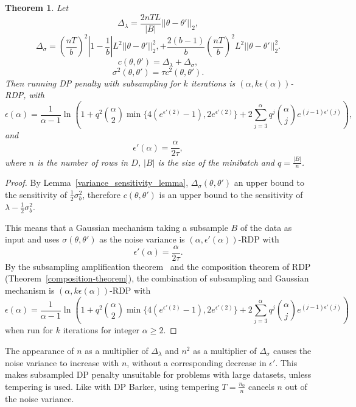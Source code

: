 \documentclass[english,twoside,openright]{HYgraduMLDS}
\newtheorem{theorem}{Theorem}
\begin{document}
\begin{theorem}
    Let
    \[
        \Delta_\lambda = \frac{2nTL}{|B|}||\theta - \theta'||_2,
    \]
    \[
        \Delta_\sigma = \left(\frac{nT}{b}\right)^2 \left|1 - \frac{1}{b}\right|
        L^2||\theta - \theta'||_2^2,
        + \frac{2(b - 1)}{b}\left(\frac{nT}{b}\right)^2 L^2||\theta - \theta'||^2_2.
    \]
    \[
        c(\theta, \theta') = \Delta_\lambda + \Delta_\sigma,
    \]
    \[
        \sigma^2(\theta, \theta') = \tau c^2(\theta, \theta').
    \]
    Then running DP penalty with subsampling for \(k\) iterations 
    is \((\alpha, k\epsilon(\alpha))\)-RDP, with
    \[
        \epsilon(\alpha) = \frac{1}{\alpha - 1}\ln \left(
        1 + q^2\binom{\alpha}{2}\min\{4(e^{\epsilon'(2)} - 1), 2e^{\epsilon'(2)}\}
        + 2 \sum_{j=3}^\alpha q^j\binom{\alpha}{j}e^{(j-1)\epsilon'(j)}\right),
    \]
    and 
    \[
        \epsilon'(\alpha) = \frac{\alpha}{2\tau},
    \]
    where \(n\) is the number of rows in \(D\), \(|B|\) is the size of the 
    minibatch and \(q = \frac{|B|}{n}\).
\end{theorem}
\begin{proof}
    By Lemma~\ref{variance_sensitivity_lemma}, 
    \(\Delta_\sigma(\theta, \theta')\) an upper 
    bound to the sensitivity of \(\frac{1}{2}\sigma_b^2\), therefore 
    \(c(\theta, \theta')\) is an upper bound to the sensitivity of 
    \(\lambda - \frac{1}{2}\sigma_b^2\).

    This means that a Gaussian mechanism taking a subsample \(B\) of the data as 
    input and uses \(\sigma(\theta, \theta')\) as the noise variance 
    is \((\alpha, \epsilon'(\alpha))\)-RDP with 
    \[
        \epsilon'(\alpha) = \frac{\alpha}{2\tau}.
    \]
    By the subsampling amplification theorem~\cite[Theorem 9]{WangBK19} and 
    the composition theorem of RDP (Theorem~\ref{composition-theorem}),
    the combination of subsampling and Gaussian mechanism is 
    \((\alpha, k\epsilon(\alpha))\)-RDP with 
    \[
        \epsilon(\alpha) = \frac{1}{\alpha - 1}\ln \left(
        1 + q^2\binom{\alpha}{2}\min\{4(e^{\epsilon'(2)} - 1), 2e^{\epsilon'(2)}\}
        + 2 \sum_{j=3}^\alpha q^j\binom{\alpha}{j}e^{(j-1)\epsilon'(j)}\right)
    \]
    when run for \(k\) iterations for integer \(\alpha \geq 2\).
\end{proof}

The appearance of \(n\) as a multiplier of \(\Delta_\lambda\) and 
\(n^2\) as a multiplier of \(\Delta_\sigma\) causes the noise variance to increase 
with \(n\), without a corresponding decrease in \(\epsilon'\). This makes subsampled 
DP penalty unsuitable for problems with large datasets, unless tempering is 
used. Like with DP Barker, using tempering \(T = \frac{n_0}{n}\) cancels \(n\)
out of the noise variance.
\end{document}
